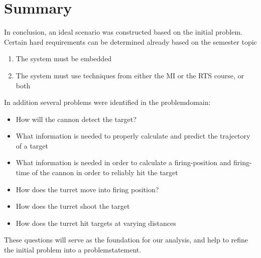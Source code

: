 \section{Summary}
In conclusion, an ideal scenario was constructed based on the initial problem.
Certain hard requirements can be determined already based on the semester topic
\begin{enumerate}
	\item The system must be embedded
	\item The system must use techniques from either the MI or the RTS course, or both
\end{enumerate}


In addition several problems were identified in the problemdomain:
\begin{itemize}
	\item How will the cannon detect the target?
	\item What information is needed to properly calculate and predict the trajectory of a target
	\item What information is needed in order to calculate a firing-position and firing-time of the cannon in order to reliably hit the target
	\item How does the turret move into firing position?
	\item How does the turret shoot the target
	\item How does the turret hit targets at varying distances
\end{itemize}
These questions will serve as the foundation for our analysis, and help to refine the initial problem into a problemstatement.
